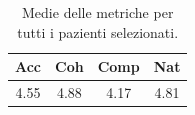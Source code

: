 
\begin{table}[!h]
\centering
\begin{tabular}{||c c c c||}
\hline
Acc & Coh & Comp & Nat \\ [0.5ex]
\hline\hline
4.55 & 4.88 & 4.17 & 4.81 \\
\hline
\end{tabular}
\caption{Medie delle metriche per tutti i pazienti selezionati.}
\label{tab:metriche_finali_pazienti}
\end{table}
